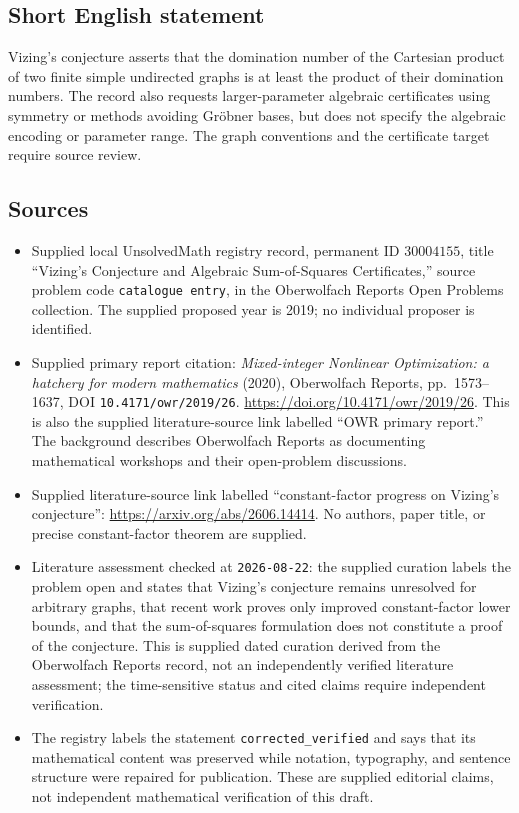 \documentclass[11pt]{article}
\begin{document}
\subsection{Short English statement}
Vizing's conjecture asserts that the domination number of the Cartesian product of two finite simple undirected graphs is at least the product of their domination numbers. The record also requests larger-parameter algebraic certificates using symmetry or methods avoiding Gröbner bases, but does not specify the algebraic encoding or parameter range. The graph conventions and the certificate target require source review.
\subsection{Sources}
\begin{itemize}
\item Supplied local UnsolvedMath registry record, permanent ID \(30004155\), title ``Vizing's Conjecture and Algebraic Sum-of-Squares Certificates,'' source problem code \texttt{catalogue entry}, in the Oberwolfach Reports Open Problems collection. The supplied proposed year is 2019; no individual proposer is identified.
\item Supplied primary report citation: \emph{Mixed-integer Nonlinear Optimization: a hatchery for modern mathematics} (2020), Oberwolfach Reports, pp.\ 1573--1637, DOI \texttt{10.4171/owr/2019/26}. \url{https://doi.org/10.4171/owr/2019/26}. This is also the supplied literature-source link labelled ``OWR primary report.'' The background describes Oberwolfach Reports as documenting mathematical workshops and their open-problem discussions.
\item Supplied literature-source link labelled ``constant-factor progress on Vizing's conjecture'': \url{https://arxiv.org/abs/2606.14414}. No authors, paper title, or precise constant-factor theorem are supplied.
\item Literature assessment checked at \texttt{2026-08-22}: the supplied curation labels the problem open and states that Vizing's conjecture remains unresolved for arbitrary graphs, that recent work proves only improved constant-factor lower bounds, and that the sum-of-squares formulation does not constitute a proof of the conjecture. This is supplied dated curation derived from the Oberwolfach Reports record, not an independently verified literature assessment; the time-sensitive status and cited claims require independent verification.
\item The registry labels the statement \texttt{corrected\_verified} and says that its mathematical content was preserved while notation, typography, and sentence structure were repaired for publication. These are supplied editorial claims, not independent mathematical verification of this draft.
\end{itemize}
\end{document}
